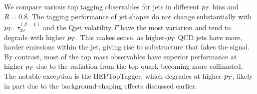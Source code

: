  We compare various top tagging observables for jets in different $p_T$ bins and $R=0.8$. The tagging performance of jet shapes do not change substantially with $p_T$. $\tau_{32}^{(\beta=1)}$ and the Qjet volatility $\Gamma$ have the most variation and tend to degrade with higher $p_T$. This makes sense, as higher-$p_T$ QCD jets have more, harder emissions within the jet, giving rise to substructure that fakes the signal. By contrast, most of the top mass observables have superior performance at higher $p_T$ due to the radiation from the top quark becoming more collimated. The notable exception is the HEPTopTagger, which degrades at higher $p_T$, likely in part due to the background-shaping effects discussed earlier.\\

\begin{figure}
\begin{center}

\end{center}
\end{figure}
